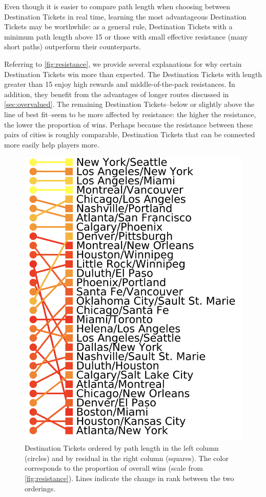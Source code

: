Even though it is easier to compare path length when choosing
between Destination Tickets in real time,
learning the most advantageous Destination Tickets may be worthwhile:
as a general rule, Destination Tickets with a minimum path
length above 15 or those with small effective resistance
(many short paths) outperform their counterparts.

Referring to \cref{fig:resistance}, 
we provide several explanations for why certain
Destination Tickets win more than expected.
The Destination Tickets with length greater than 15 
enjoy high rewards and middle-of-the-pack 
resistances.
In addition, they benefit from the advantages of longer 
routes discussed in \cref{sec:overvalued}.
The remaining Destination Tickets--below or slightly 
above the line of best fit--seem to be more affected
by resistance: the higher the resistance, the
lower the proportion of wins.
Perhaps because the resistance between these pairs of cities
is roughly comparable, Destination Tickets that 
can be connected more easily help players more.

\begin{figure}[H]
    \centering
    \includegraphics[scale=.25]{figures/rankings.png}
    \caption{Destination Tickets ordered by path length
    in the left column (circles) and by residual
    in the right column (squares). The color
    corresponds to the proportion of overall wins (scale
    from \cref{fig:resistance}).
    Lines indicate the change in rank between
    the two orderings.}
    \label{fig:rankings}
\end{figure}

